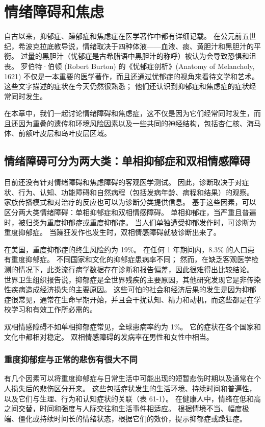 \chapter{情绪障碍和焦虑} \label{chap:chap61}

自古以来，抑郁症、躁郁症和焦虑症在医学著作中都有详细记载。 在公元前五世纪，希波克拉底教导说，情绪取决于四种体液——血液、痰、黄胆汁和黑胆汁的平衡。 过量的黑胆汁（忧郁症是古希腊语中黑胆汁的称呼）被认为会导致恐惧和沮丧。 罗伯特·伯顿 (Robert Burton) 的《忧郁症剖析》(Anatomy of Melancholy, 1621) 不仅是一本重要的医学著作，而且还通过忧郁症的视角来看待文学和艺术。 这些文字描述的症状在今天仍然很熟悉； 他们还认识到抑郁症和焦虑症的症状经常同时发生。

在本章中，我们一起讨论情绪障碍和焦虑症，这不仅是因为它们经常同时发生，而且还因为重叠的遗传和环境风险因素以及一些共同的神经结构，包括杏仁核、海马体、前额叶皮层和岛叶皮层区域。

\section{情绪障碍可分为两大类：单相抑郁症和双相情感障碍}
目前还没有针对情绪障碍和焦虑障碍的客观医学测试。 因此，诊断取决于对症状、行为、认知、功能障碍和自然病程（包括发病年龄、病程和结果）的观察。 家族传播模式和对治疗的反应也可以为诊断分类提供信息。 基于这些因素，可以区分两大类情绪障碍：单相抑郁症和双相情感障碍。 单相抑郁症，当严重且普遍时，被归类为重度抑郁症或重度抑郁症。 当人们单独遭受抑郁发作时，可诊断为重度抑郁症。 当躁狂发作也发生时，双相情感障碍就被诊断出来了。

在美国，重度抑郁症的终生风险约为 19\%。 在任何 1 年期间内，8.3\% 的人口患有重度抑郁症。 不同国家和文化的抑郁症患病率不同； 然而，在缺乏客观医学检测的情况下，此类流行病学数据存在诊断和报告偏差，因此很难得出比较结论。 世界卫生组织报告说，抑郁症是全世界残疾的主要原因，其他研究发现它是非传染性疾病造成经济损失的主要原因。 这些可怕的社会和经济后果的发生是因为抑郁症很常见，通常在生命早期开始，并且会干扰认知、精力和动机，而这些都是在学校学习和有效工作所必需的。

双相情感障碍不如单相抑郁症常见，全球患病率约为 1\%。 它的症状在各个国家和文化中都相对稳定。 双相情感障碍的发病率在男性和女性中相当。

\subsection{重度抑郁症与正常的悲伤有很大不同}
有几个因素可以将重度抑郁症与日常生活中可能出现的短暂悲伤时期以及通常在个人损失后的悲伤区分开来。 这些包括症状发生的生活环境、持续时间和普遍性，以及它们与生理、行为和认知症状的关联（表 61-1）。 在健康人中，情绪在低和高之间交替，时间和强度与人际交往和生活事件相适应。 根据情境不当、幅度极端、僵化或持续时间长的情绪状态，根据它们的效价，提示抑郁症或躁狂症。

